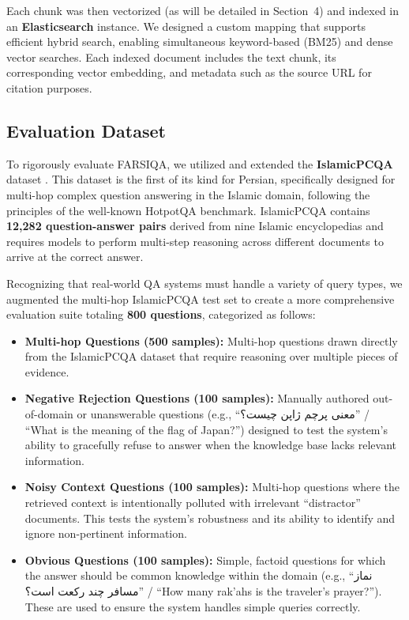 \documentclass[11pt]{article}
\newcommand{\fa}[1]{\textfarsi{#1}}
\begin{document}
Each chunk was then vectorized (as will be detailed in Section~4) and indexed in an \textbf{Elasticsearch} instance. We designed a custom mapping that supports efficient hybrid search, enabling simultaneous keyword-based (BM25) \cite{robertson2009probabilistic} and dense vector searches. Each indexed document includes the text chunk, its corresponding vector embedding, and metadata such as the source URL for citation purposes.

\subsection{Evaluation Dataset}

To rigorously evaluate FARSIQA, we utilized and extended the \textbf{IslamicPCQA} dataset \cite{11075543}. This dataset is the first of its kind for Persian, specifically designed for multi-hop complex question answering in the Islamic domain, following the principles of the well-known HotpotQA benchmark. IslamicPCQA contains \textbf{12,282 question-answer pairs} derived from nine Islamic encyclopedias and requires models to perform multi-step reasoning across different documents to arrive at the correct answer.

Recognizing that real-world QA systems must handle a variety of query types, we augmented the multi-hop IslamicPCQA test set to create a more comprehensive evaluation suite totaling \textbf{800 questions}, categorized as follows:

\begin{itemize}
    \item \textbf{Multi-hop Questions (500 samples):} Multi-hop questions drawn directly from the IslamicPCQA dataset that require reasoning over multiple pieces of evidence.
  \item \textbf{Negative Rejection Questions (100 samples):} Manually authored out-of-domain or unanswerable questions (e.g., ``\fa{معنی پرچم ژاپن چیست؟}'' / ``What is the meaning of the flag of Japan?'') designed to test the system's ability to gracefully refuse to answer when the knowledge base lacks relevant information.
    \item \textbf{Noisy Context Questions (100 samples):} Multi-hop questions where the retrieved context is intentionally polluted with irrelevant ``distractor'' documents. This tests the system's robustness and its ability to identify and ignore non-pertinent information.
  \item \textbf{Obvious Questions (100 samples):} Simple, factoid questions for which the answer should be common knowledge within the domain (e.g., ``\fa{نماز مسافر چند رکعت است؟}'' / ``How many rak'ahs is the traveler's prayer?''). These are used to ensure the system handles simple queries correctly.
\end{itemize}
\end{document}
